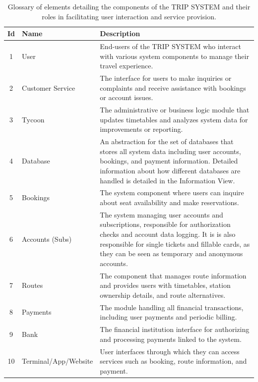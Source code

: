 \begin{table}[H]
    \centering
    \begin{tabular}{@{}clp{9cm}@{}}
    \toprule
    \textbf{Id} & \textbf{Name} & \textbf{Description} \\
    \midrule
    1 & User & End-users of the TRIP SYSTEM who interact with various system components to manage their travel experience. \\
    2 & Customer Service & The interface for users to make inquiries or complaints and receive assistance with bookings or account issues. \\
    3 & Tycoon & The administrative or business logic module that updates timetables and analyzes system data for improvements or reporting. \\
    4 & Database & An abstraction for the set of databases that stores all system data including user accounts, bookings, and payment information. Detailed information about how different databases are handled is detailed in the Information View.\\
    5 & Bookings & The system component where users can inquire about seat availability and make reservations. \\
    6 & Accounts (Subs) & The system managing user accounts and subscriptions, responsible for authorization checks and account data logging. 
    It is is also responsible for single tickets and fillable cards, as they can be seen as temporary and anonymous accounts. \\
    7 & Routes & The component that manages route information and provides users with timetables, station ownership details, and route alternatives. \\
    8 & Payments & The module handling all financial transactions, including user payments and periodic billing. \\
    9 & Bank & The financial institution interface for authorizing and processing payments linked to the system. \\
    10 & Terminal/App/Website & User interfaces through which they can access services such as booking, route information, and payment. \\
    \bottomrule
    \end{tabular}
    \caption{Glossary of elements detailing the components of the TRIP SYSTEM and their roles in facilitating user interaction and service provision.}
    \label{tab:glossary_trip_system}
\end{table}

